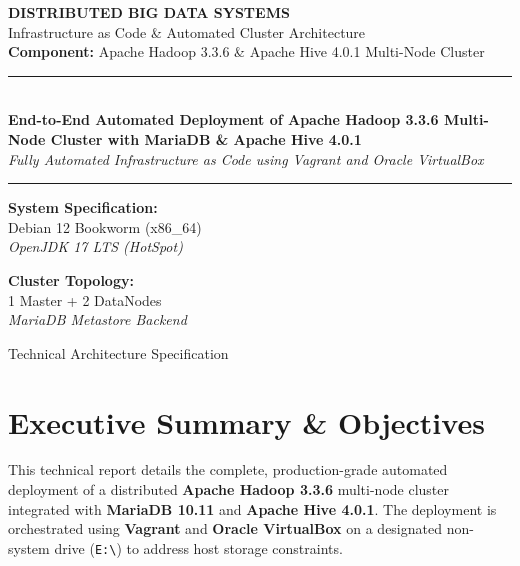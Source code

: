 \documentclass[11pt,a4paper]{article}
\begin{document}
\begin{titlepage}
    \centering
    \vspace*{1cm}
    
    {\Huge \textbf{DISTRIBUTED BIG DATA SYSTEMS}}\\[0.3cm]
    {\Large Infrastructure as Code \& Automated Cluster Architecture}\\[0.2cm]
    {\large \textbf{Component:} Apache Hadoop 3.3.6 \& Apache Hive 4.0.1 Multi-Node Cluster}
    
    \vspace{1.5cm}
    \rule{\linewidth}{1.5pt}\\[0.4cm]
    {\Huge \bfseries End-to-End Automated Deployment of Apache Hadoop 3.3.6 Multi-Node Cluster with MariaDB \& Apache Hive 4.0.1}\\[0.2cm]
    {\Large \textit{Fully Automated Infrastructure as Code using Vagrant and Oracle VirtualBox}}\\[0.2cm]
    \rule{\linewidth}{1.5pt}
    
    \vspace{2cm}
    
    \begin{minipage}{0.45\textwidth}
        \begin{flushleft} \large
            \textbf{System Specification:}\\
            Debian 12 Bookworm (x86\_64)\\
            \textit{OpenJDK 17 LTS (HotSpot)}
        \end{flushleft}
    \end{minipage}
    \hfill
    \begin{minipage}{0.45\textwidth}
        \begin{flushright} \large
            \textbf{Cluster Topology:}\\
            1 Master + 2 DataNodes\\
            \textit{MariaDB Metastore Backend}
        \end{flushright}
    \end{minipage}
    
    \vfill
    {\large Technical Architecture Specification}
\end{titlepage}

\tableofcontents
\newpage

\section{Executive Summary \& Objectives}
This technical report details the complete, production-grade automated deployment of a distributed \textbf{Apache Hadoop 3.3.6} multi-node cluster integrated with \textbf{MariaDB 10.11} and \textbf{Apache Hive 4.0.1}. The deployment is orchestrated using \textbf{Vagrant} and \textbf{Oracle VirtualBox} on a designated non-system drive (\texttt{E:\textbackslash}) to address host storage constraints.
\end{document}
